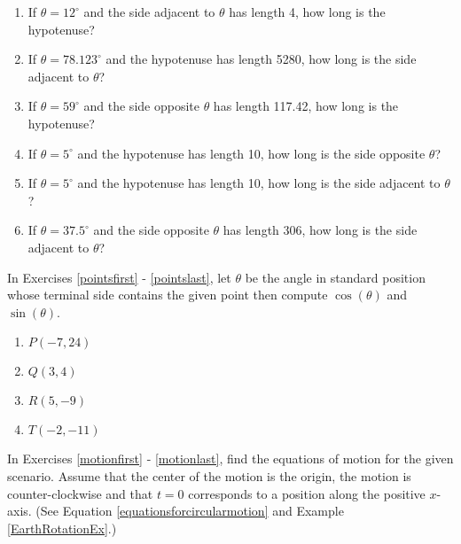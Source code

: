 \begin{enumerate}

\setcounter{enumi}{\value{HW}}

\item If $\theta = 12^{\circ}$ and the side adjacent to $\theta$ has length 4, how long is the hypotenuse? \label{missingsidefirst}
\item If $\theta = 78.123^{\circ}$ and the hypotenuse has length 5280, how long is the side adjacent to $\theta$?
\item If $\theta = 59^{\circ}$ and the side opposite $\theta$ has length 117.42, how long is the hypotenuse?
\item If $\theta = 5^{\circ}$ and the hypotenuse has length 10, how long is the side opposite $\theta$?
\item If $\theta = 5^{\circ}$ and the hypotenuse has length 10, how long is the side adjacent to $\theta$?
\item If $\theta = 37.5^{\circ}$ and the side opposite $\theta$ has length 306, how long is the side adjacent to $\theta$? \label{missingsidelast}

\setcounter{HW}{\value{enumi}}

\end{enumerate}

In Exercises \ref{pointsfirst} - \ref{pointslast}, let $\theta$ be the angle in standard position whose terminal side contains the given point then compute $\cos(\theta)$ and $\sin(\theta)$.

\begin{multicols}{4}

\begin{enumerate}

\setcounter{enumi}{\value{HW}}

\item $P(-7, 24)$ \label{pointsfirst} 
\item $Q(3, 4)$
\item $R(5, -9)$
\item $T(-2, -11)$ \label{pointslast}

\setcounter{HW}{\value{enumi}}

\end{enumerate}

\end{multicols}

In Exercises \ref{motionfirst} - \ref{motionlast}, find the equations of motion for the given scenario.  Assume that the center of the motion is the origin, the motion is counter-clockwise and that $t = 0$ corresponds to a position along the positive $x$-axis.  (See Equation \ref{equationsforcircularmotion} and Example \ref{EarthRotationEx}.)


